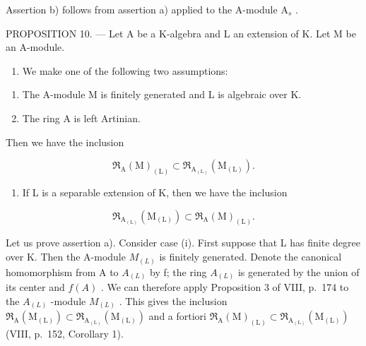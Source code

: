 Assertion b) follows from assertion a) applied to the A-module \(\mathrm{A}_s\) .

PROPOSITION 10. --- Let A be a K-algebra and L an extension of K. Let M be an A-module.

\begin{enumerate}
\def\labelenumi{\alph{enumi})}
\tightlist
\item
  We make one of the following two assumptions:
\end{enumerate}

\begin{enumerate}
\def\labelenumi{(\roman{enumi})}
\item
  The A-module M is finitely generated and L is algebraic over K.
\item
  The ring A is left Artinian.
\end{enumerate}

Then we have the inclusion

\[
\mathfrak {R} _ {\mathrm{A}} (\mathrm{M}) _ {(\mathrm{L})} \subset \mathfrak {R} _ {\mathrm{A} _ {(\mathrm{L})}} (\mathrm{M} _ {(\mathrm{L})}).
\]

\begin{enumerate}
\def\labelenumi{\alph{enumi})}
\setcounter{enumi}{1}
\tightlist
\item
  If L is a separable extension of K, then we have the inclusion
\end{enumerate}

\[
\mathfrak {R} _ {\mathrm{A} _ {(\mathrm{L})}} (\mathrm{M} _ {(\mathrm{L})}) \subset \mathfrak {R} _ {\mathrm{A}} (\mathrm{M}) _ {(\mathrm{L})}.
\]

Let us prove assertion a). Consider case (i). First suppose that L has finite degree over K. Then the A-module \(M_{(L)}\) is finitely generated. Denote the canonical homomorphism from A to \(A_{(L)}\) by f; the ring \(A_{(L)}\) is generated by the union of its center and \(f(A)\) . We can therefore apply Proposition 3 of VIII, p.~174 to the \(A_{(L)}\) -module \(M_{(L)}\) . This gives the inclusion \(\mathfrak{R}_{\mathrm{A}}(\mathrm{M}_{(\mathrm{L})}) \subset \mathfrak{R}_{\mathrm{A}_{(\mathrm{L})}}(\mathrm{M}_{(\mathrm{L})})\) and a fortiori \(\mathfrak{R}_{\mathrm{A}}(\mathrm{M})_{(\mathrm{L})} \subset \mathfrak{R}_{\mathrm{A}_{(\mathrm{L})}}(\mathrm{M}_{(\mathrm{L})})\) (VIII, p.~152, Corollary 1).

